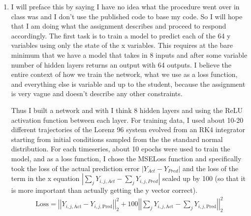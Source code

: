 \documentclass{article}
\begin{document}
\begin{enumerate}[label = \alph*).]
    \item I will preface this by saying I have no idea what the procedure
    went over in class was and I don't use the published code to base my code.
    So I will hope that I am doing what the assignment describes and proceed to
    respond accordingly. The first task is to train a model to predict each of
    the 64 y variables using only the state of the x variables. This requires
    at the bare minimum that we have a model that takes in 8 inputs and
    after some variable number of hidden layers returns an output with 64
    outputs. I believe the entire context of how we train the network, what we
    use as a loss function, and everything else is variable and up to the
    student, because the assignment is very vague and doesn't describe any other
    constraints. 

    Thus I built a network and with I think 8 hidden layers and using the ReLU
    activation function between each layer. For training data, I used about 10-20 different
    trajectories of the Lorenz 96 system evolved from an RK4 integrator starting
    from initial conditions sampled from the the standard normal distribution.
    For each timeseries, about 10 epochs were used to train the model, and as a
    loss function, I chose the MSELoss function and specifically took the loss
    of the actual prediction error $|Y_{Act} - Y_{Pred}|$ and the loss of the
    term in the x equation $|\sum_{j} Y_{i,j, Act} - \sum_jY_{i,j, Pred}|$
    scaled up by 100 (so that it is more important than actually getting the y
    vector correct). 
    \begin{gather*}
        \text{Loss} = \left|\left|Y_{i,j,\text{Act}} -
        Y_{i,j,\text{Pred}}\right|\right|_2^2 +
        100\left|\left|\sum_j Y_{i,j,\text{Act}} - \sum_j Y_{i,j,\text{Pred}}\right|\right|_2^2
    \end{gather*}


\end{enumerate}
\end{document}
